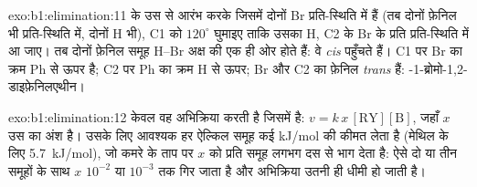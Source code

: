 \begin{solution}{exo:b1:elimination:11}
 के उस  से आरंभ करके जिसमें दोनों Br प्रति-स्थिति में हैं
(तब दोनों फ़ेनिल भी प्रति-स्थिति में, दोनों H भी), C1 को $120^\circ$ घुमाइए ताकि
उसका H, C2 के Br के प्रति प्रति-स्थिति में आ जाए। तब दोनों फ़ेनिल समूह H--Br अक्ष की
एक ही ओर होते हैं: वे \textit{cis} पहुँचते हैं। C1 पर Br का क्रम
Ph से ऊपर है; C2 पर Ph का क्रम H से ऊपर; Br और C2 का फ़ेनिल \textit{trans} हैं:
-1-ब्रोमो-1,2-डाइफ़ेनिलएथीन।
\end{solution}

\begin{solution}{exo:b1:elimination:12}
केवल वह  अभिक्रिया करती है जिसमें   है: $v = k\,x\,[\mathrm{RY}][\mathrm{B}]$,
जहाँ $x$ उस  का अंश है। उसके लिए आवश्यक हर  ऐल्किल समूह
कई kJ/mol की कीमत लेता है (मेथिल के लिए \qty{5.7}{kJ/mol}), जो कमरे के ताप पर $x$ को
प्रति समूह लगभग दस से भाग देता है: ऐसे दो या तीन समूहों के साथ $x$
$10^{-2}$ या $10^{-3}$ तक गिर जाता है और अभिक्रिया उतनी ही धीमी हो जाती है।
\end{solution}

